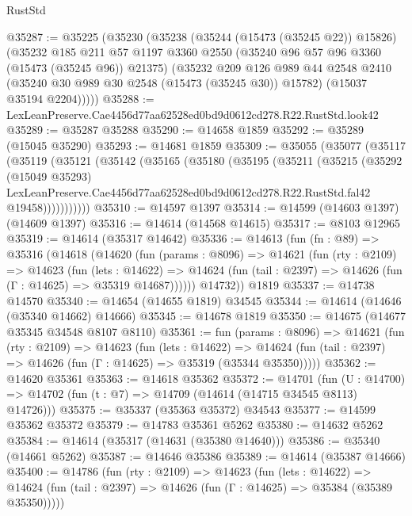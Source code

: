 \begin{lexlean}{RustStd}
\begin{coremodule}
@35287 := @35225
    (@35230
      (@35238
        (@35244 (@15473 (@35245 @22)) @15826)
        (@35232
          @185
          @211
          @57
          @1197
          @3360
          @2550
          (@35240 @96 @57 @96 @3360 (@15473 (@35245 @96)) @21375)
          (@35232
            @209
            @126
            @989
            @44
            @2548
            @2410
            (@35240 @30 @989 @30 @2548 (@15473 (@35245 @30)) @15782)
            (@15037 @35194 @2204)))))
@35288 := LexLeanPreserve.Cae4456d77aa62528ed0bd9d0612cd278.R22.RustStd.look42
@35289 := @35287 @35288
@35290 := @14658 @1859
@35292 := @35289 (@15045 @35290)
@35293 := @14681 @1859
@35309 := @35055
    (@35077
      (@35117
        (@35119
          (@35121
            (@35142
              (@35165
                (@35180
                  (@35195
                    (@35211
                      (@35215
                        (@35292
                          (@15049 @35293)
                          LexLeanPreserve.Cae4456d77aa62528ed0bd9d0612cd278.R22.RustStd.fal42
                          @19458)))))))))))
@35310 := @14597 @1397
@35314 := @14599 (@14603 @1397) (@14609 @1397)
@35316 := @14614 (@14568 @14615)
@35317 := @8103 @12965
@35319 := @14614 (@35317 @14642)
@35336 := @14613
    (fun (fn : @89) =>
    @35316
      (@14618
        (@14620
          (fun (params : @8096) =>
          @14621
            (fun (rty : @2109) =>
            @14623
              (fun (lets : @14622) =>
              @14624 (fun (tail : @2397) => @14626 (fun (Γ : @14625) => @35319 @14687))))))
        @14732))
    @1819
@35337 := @14738 @14570
@35340 := @14654 (@14655 @1819) @34545
@35344 := @14614 (@14646 (@35340 @14662) @14666)
@35345 := @14678 @1819
@35350 := @14675 (@14677 @35345 @34548 @8107 @8110)
@35361 := fun (params : @8096) =>
  @14621
    (fun (rty : @2109) =>
    @14623
      (fun (lets : @14622) =>
      @14624 (fun (tail : @2397) => @14626 (fun (Γ : @14625) => @35319 (@35344 @35350)))))
@35362 := @14620 @35361
@35363 := @14618 @35362
@35372 := @14701
    (fun (U : @14700) => @14702 (fun (t : @7) => @14709 (@14614 (@14715 @34545 @8113) @14726)))
@35375 := @35337 (@35363 @35372) @34543
@35377 := @14599 @35362 @35372
@35379 := @14783 @35361 @5262
@35380 := @14632 @5262
@35384 := @14614 (@35317 (@14631 (@35380 @14640)))
@35386 := @35340 (@14661 @5262)
@35387 := @14646 @35386
@35389 := @14614 (@35387 @14666)
@35400 := @14786
    (fun (rty : @2109) =>
    @14623
      (fun (lets : @14622) =>
      @14624 (fun (tail : @2397) => @14626 (fun (Γ : @14625) => @35384 (@35389 @35350)))))

\end{coremodule}
\end{lexlean}
